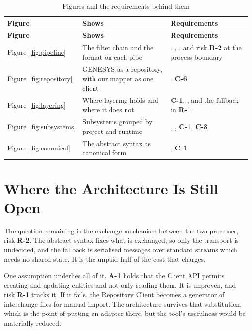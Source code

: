 \begin{longtable}{L{0.26\textwidth}L{0.30\textwidth}L{0.36\textwidth}}
	\caption{Figures and the requirements behind them}\label{tab:fig-trace}\\
	\toprule
	\textbf{Figure} & \textbf{Shows} & \textbf{Requirements} \\
	\midrule
	\endfirsthead
	\toprule
	\textbf{Figure} & \textbf{Shows} & \textbf{Requirements} \\
	\midrule
	\endhead

	Figure~\ref{fig:pipeline} & The filter chain and the format on each
	pipe & , , , and risk \textbf{R-2} at the
	process boundary \\
	\addlinespace
	Figure~\ref{fig:repository} & GENESYS as a repository, with our mapper as
	one client & , \textbf{C-6} \\
	\addlinespace
	Figure~\ref{fig:layering} & Where layering holds and where it does
	not & \textbf{C-1}, , and the fallback in \textbf{R-1} \\
	\addlinespace
	Figure~\ref{fig:subsystems} & Subsystems grouped by project and
	runtime & , , \textbf{C-1}, \textbf{C-3} \\
	\addlinespace
	Figure~\ref{fig:canonical} & The abstract syntax as canonical form &
	, \textbf{C-1} \\
	\bottomrule
\end{longtable}

\section{Where the Architecture Is Still Open}

The question remaining is the exchange mechanism between the two processes, risk
\textbf{R-2}. The abstract syntax fixes what is exchanged, so only the transport
is undecided, and the fallback is serialised messages over standard streams
which needs no shared state. It is the unpaid half of the cost that
 charges.

One assumption underlies all of it. \textbf{A-1} holds that the Client API
permits creating and updating entities and not only reading them. It is
unproven, and risk \textbf{R-1} tracks it. If it fails, the Repository Client
becomes a generator of interchange files for manual import. The architecture
survives that substitution, which is the point of putting an adapter there, but
the tool's usefulness would be materially reduced.
